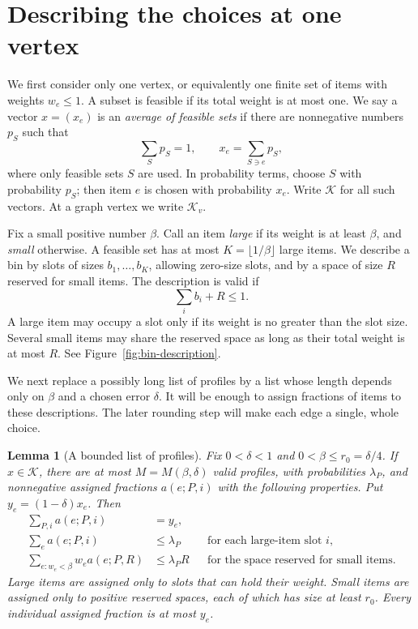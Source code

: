 \documentclass[11pt]{article}
\newtheorem{lemma}[theorem]{Lemma}
\theoremstyle{definition}\newtheorem{algorithm}{Algorithm}[section]
\numberwithin{equation}{section}
\theoremstyle{remark}\newtheorem*{remark}{Remark}
\begin{document}
\section{Describing the choices at one vertex}\label{sec:local}
We first consider only one vertex, or equivalently one finite set of items
with weights $w_e\le1$. A subset is feasible if its total weight is at
most one. We say a vector $x=(x_e)$ is an \emph{average of feasible sets}
if there are nonnegative numbers $p_S$ such that
\[
 \sum_Sp_S=1,\qquad x_e=\sum_{S\ni e}p_S,
\]
where only feasible sets $S$ are used. In probability terms, choose $S$
with probability $p_S$; then item $e$ is chosen with probability $x_e$.
Write $\mathcal K$ for all such vectors. At a graph vertex we write $\mathcal K_v$.

Fix a small positive number $\beta$. Call an item \emph{large} if its
weight is at least $\beta$, and \emph{small} otherwise. A feasible set
has at most $K=\lfloor1/\beta\rfloor$ large items. We describe a bin by
slots of sizes $b_1,\ldots,b_K$, allowing zero-size slots, and by a
space of size $R$ reserved for small items. The description is valid if
\[
 \sum_i b_i+R\le1.
\]
A large item may occupy a slot only if its weight is no greater than
the slot size. Several small items may share the reserved space as long
as their total weight is at most $R$. See Figure~\ref{fig:bin-description}.





We next replace a possibly long list of profiles by a list whose
length depends only on $\beta$ and a chosen error $\delta$. It will be
enough to assign fractions of items to these descriptions. The later
rounding step will make each edge a single, whole choice.

\begin{lemma}[A bounded list of profiles]\label{lem:profiles}
Fix $0<\delta<1$ and $0<\beta\le r_0=\delta/4$. If $x\in\mathcal K$,
there are at most $M=M(\beta,\delta)$ valid profiles, with
probabilities $\lambda_P$, and nonnegative assigned fractions $a(e;P,i)$
with the following properties. Put $y_e=(1-\delta)x_e$. Then
\begin{align}
 \sum_{P,i}a(e;P,i)&=y_e,\label{eq:marginal}\\
 \sum_e a(e;P,i)&\le\lambda_P
       &&\text{for each large-item slot }i,\label{eq:slot}\\
 \sum_{e:w_e<\beta}w_ea(e;P,R)&\le\lambda_PR
       &&\text{for the space reserved for small items}.\label{eq:reservoir}
\end{align}
Large items are assigned only to slots that can hold their weight. Small
items are assigned only to positive reserved spaces, each of which has
size at least $r_0$. Every individual assigned fraction is at most $y_e$.
\end{lemma}
\end{document}

